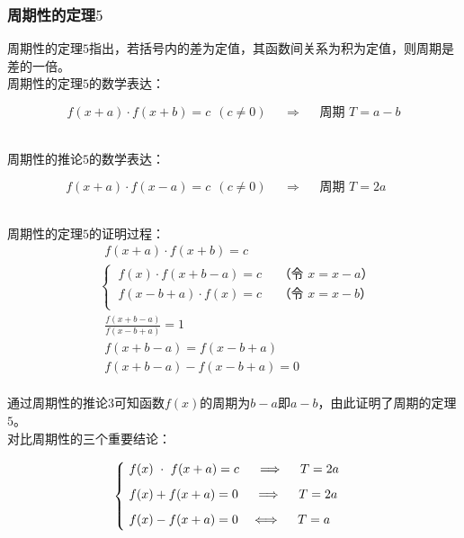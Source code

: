 \documentclass[UTF8]{ctexart}
\begin{document}
\subsubsection{周期性的定理$5$}
    \setcounter{equation}{0}
    周期性的定理$5$指出，若括号内的差为定值，其函数间关系为积为定值，则周期是差的一倍。\\[3mm]
    周期性的定理$5$的数学表达：
    \begin{large}
        \begin{equation*}
            f(x+a)\cdot f(x+b)=c~~(c\neq 0)~~~~~~\Longrightarrow~~~~~~\text{周期~}T=a-b
        \end{equation*}
    \end{large}\\
    周期性的推论$5$的数学表达：
    \begin{large}
        \begin{equation*}
            f(x+a)\cdot f(x-a)=c~~(c\neq 0)~~~~~~\Longrightarrow~~~~~~\text{周期~}T=2a\hspace{15pt}
        \end{equation*}
    \end{large}\\
    周期性的定理$5$的证明过程：
    \begin{align}
        &~~f(x+a)\cdot f(x+b)=c\\[3.5mm]
        &\begin{cases}
            ~f(x)\cdot f(x+b-a)=c~~~~~~\text{（令~}x=x-a\text{）}\\[1mm]
            ~f(x-b+a)\cdot f(x)=c~~~~~~\text{（令~}x=x-b\text{）}\\[1mm]
        \end{cases}\\[3.5mm]
        &~~\frac{f(x+b-a)}{f(x-b+a)}=1\\[3.5mm]
        &~~f(x+b-a)=f(x-b+a)\\[3.5mm]
        &~~f(x+b-a)-f(x-b+a)=0
    \end{align}\\
    通过周期性的推论$3$可知函数$f(x)$的周期为$b-a$即$a-b$，由此证明了周期的定理$5$。\\[3mm]
    对比周期性的三个重要结论：\vspace{5pt}
    \begin{large}
        \begin{equation*}
            \begin{cases}
                ~f(x)\hspace{3.2pt}\cdot\hspace{3.2pt}f(x+a)=c~~~~\hspace{0.5pt}\Longrightarrow~~~~T=2a\\[2mm]
                ~f(x)+f(x+a)=0~~~~\Longrightarrow~~~~T=2a\\[2mm]
                ~f(x)-f(x+a)=0~~~\hspace{0.3pt}\Longleftrightarrow~~~~T=a\\[1mm]
            \end{cases}
        \end{equation*}
    \end{large}\\
\end{document}

